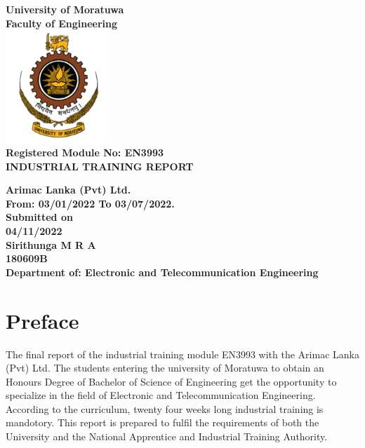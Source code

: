 \documentclass[twoside,12pt,times,onecolumn,a4paper]{report}
\begin{document}
\begin{titlepage}
\pagecolor{lightpink}\afterpage{\nopagecolor}
\center 

\textbf{\Huge University of Moratuwa}\\[1cm]
\textbf{\Large Faculty of Engineering}\\[1cm]

\includegraphics[width=0.3\textwidth]{uomlogo}\\[2cm]

	
\textbf{\Large {Registered Module No: EN3993 }  }\\[1cm]
\textbf{\Large {INDUSTRIAL TRAINING REPORT}}\\[1cm]
\vspace{1cm}

\begin{minipage}{1\textwidth}
	\begin{flushleft}
		\center 
		\textbf{\Large {Arimac Lanka (Pvt) Ltd.}  }\\[1cm]
		\textbf{\Large {From: 03/01/2022 To 03/07/2022.}  }\\[1cm]
		\textbf{\large Submitted on}\\[0.1cm]
		\textbf{\Large 04/11/2022}\\[0.5cm]
		\textbf{\large Sirithunga M R A}\\[0.1cm]
		\textbf{\large 180609B}\\[0.5cm]
		\textbf{\large Department of: Electronic and Telecommunication Engineering}\\[0.5cm]
	\end{flushleft}
\end{minipage}
\hspace{5mm}



\vfill
\end{titlepage}

\chapter{Preface}
\hspace{3em} The final report of the industrial training module EN3993 with the Arimac Lanka (Pvt) Ltd. The students entering the university of Moratuwa to obtain an Honours Degree of Bachelor of Science of Engineering get the opportunity to specialize in the field of Electronic and Telecommunication Engineering. According to the curriculum, twenty four weeks long industrial training is mandotory. This report is prepared to fulfil the requirements of both the University and the National Apprentice and Industrial Training Authority. 
\end{document}
